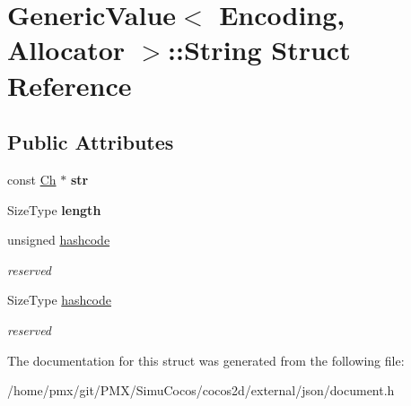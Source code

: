 \hypertarget{structGenericValue_1_1String}{}\section{Generic\+Value$<$ Encoding, Allocator $>$\+:\+:String Struct Reference}
\label{structGenericValue_1_1String}
\subsection*{Public Attributes}
\begin{DoxyCompactItemize}
\item 
\mbox{\label{structGenericValue_1_1String_a7bbed0942d66b0e4a409d73cbc988967}} 
const \hyperlink{classGenericValue_ade0e0ce64ccd5d852da57a35e720bafb}{Ch} $\ast$ {\bfseries str}
\item 
\mbox{\label{structGenericValue_1_1String_ad6ffab0e093aa8db6e415812ff6443bf}} 
Size\+Type {\bfseries length}
\item 
\mbox{\label{structGenericValue_1_1String_a3f1da673591f850e425184f2d8495d66}} 
unsigned \hyperlink{structGenericValue_1_1String_a3f1da673591f850e425184f2d8495d66}{hashcode}
\begin{DoxyCompactList}\small\item\em reserved \end{DoxyCompactList}\item 
\mbox{\label{structGenericValue_1_1String_a73631052aeb72fbabb6eaab0175f858e}} 
Size\+Type \hyperlink{structGenericValue_1_1String_a73631052aeb72fbabb6eaab0175f858e}{hashcode}
\begin{DoxyCompactList}\small\item\em reserved \end{DoxyCompactList}\end{DoxyCompactItemize}


The documentation for this struct was generated from the following file\+:\begin{DoxyCompactItemize}
\item 
/home/pmx/git/\+P\+M\+X/\+Simu\+Cocos/cocos2d/external/json/document.\+h\end{DoxyCompactItemize}
